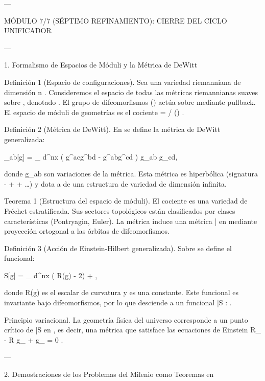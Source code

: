 \documentclass[12pt,twoside]{book}
\begin{document}
---

MÓDULO 7/7 (SÉPTIMO REFINAMIENTO): CIERRE DEL CICLO UNIFICADOR

---

1. Formalismo de Espacios de Móduli y la Métrica de DeWitt

Definición 1 (Espacio de configuraciones). Sea    una variedad riemanniana de dimensión  n . Consideremos el espacio de todas las métricas riemannianas suaves sobre   , denotado   . El grupo de difeomorfismos  ()  actúa sobre    mediante pullback. El espacio de móduli de geometrías es el cociente   =  / () .

Definición 2 (Métrica de DeWitt). En    se define la métrica de DeWitt generalizada:

_{ab}[g] = \int_{} d^nx  \left( g^{ac}g^{bd} - g^{ab}g^{cd} \right) \delta g_{ab} \delta g_{cd},

donde  \delta g_{ab}  son variaciones de la métrica. Esta métrica es hiperbólica (signatura  - + + \dots ) y dota a    de una estructura de variedad de dimensión infinita.

Teorema 1 (Estructura del espacio de móduli). El cociente    es una variedad de Fréchet estratificada. Sus sectores topológicos están clasificados por clases características (Pontryagin, Euler). La métrica    induce una métrica  \bar{}  en    mediante proyección ortogonal a las órbitas de difeomorfismos.

Definición 3 (Acción de Einstein-Hilbert generalizada). Sobre    se define el funcional:

S[g] = \int_{} d^nx  \left( R(g) - 2\Lambda \right) + ,

donde  R(g)  es el escalar de curvatura y  \Lambda  es una constante. Este funcional es invariante bajo difeomorfismos, por lo que desciende a un funcional  \bar{S} :  \to {} .

Principio variacional. La geometría física del universo corresponde a un punto crítico de  \bar{S}  en   , es decir, una métrica que satisface las ecuaciones de Einstein  R_{\mu\nu} - R g_{\mu\nu} + \Lambda g_{\mu\nu} = 0 .

---

2. Demostraciones de los Problemas del Milenio como Teoremas en   
\end{document}
